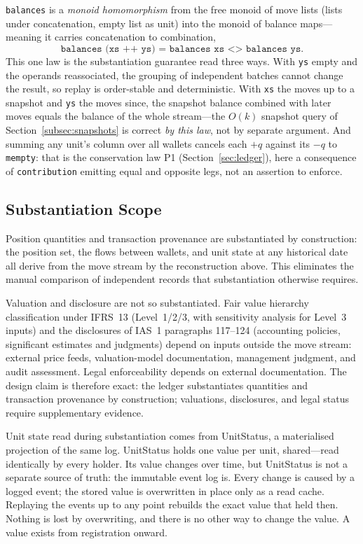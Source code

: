 \begin{remark}
\lstinline!balances! is a \emph{monoid homomorphism} from the free monoid of move lists (lists under concatenation, empty list as unit) into the monoid of balance maps---meaning it carries concatenation to combination,
\[
\texttt{balances (xs ++ ys) = balances xs <> balances ys}.
\]
This one law is the substantiation guarantee read three ways. With \texttt{ys} empty and the operands reassociated, the grouping of independent batches cannot change the result, so replay is order-stable and deterministic. With \texttt{xs} the moves up to a snapshot and \texttt{ys} the moves since, the snapshot balance combined with later moves equals the balance of the whole stream---the $O(k)$ snapshot query of Section~\ref{subsec:snapshots} is correct \emph{by this law}, not by separate argument. And summing any unit's column over all wallets cancels each $+q$ against its $-q$ to \texttt{mempty}: that is the conservation law P1 (Section~\ref{sec:ledger}), here a consequence of \lstinline!contribution! emitting equal and opposite legs, not an assertion to enforce.
\end{remark}

\subsection{Substantiation Scope}

Position quantities and transaction provenance are substantiated by construction: the position set, the flows between wallets, and unit state at any historical date all derive from the move stream by the reconstruction above. This eliminates the manual comparison of independent records that substantiation otherwise requires.

Valuation and disclosure are not so substantiated. Fair value hierarchy classification under IFRS~13 (Level~1/2/3, with sensitivity analysis for Level~3 inputs) and the disclosures of IAS~1 paragraphs 117--124 (accounting policies, significant estimates and judgments) depend on inputs outside the move stream: external price feeds, valuation-model documentation, management judgment, and audit assessment. Legal enforceability depends on external documentation. The design claim is therefore exact: the ledger substantiates quantities and transaction provenance by construction; valuations, disclosures, and legal status require supplementary evidence.

Unit state read during substantiation comes from UnitStatus, a materialised projection of the same log. UnitStatus holds one value per unit, shared---read identically by every holder. Its value changes over time, but UnitStatus is not a separate source of truth: the immutable event log is. Every change is caused by a logged event; the stored value is overwritten in place only as a read cache. Replaying the events up to any point rebuilds the exact value that held then. Nothing is lost by overwriting, and there is no other way to change the value. A value exists from registration onward.

